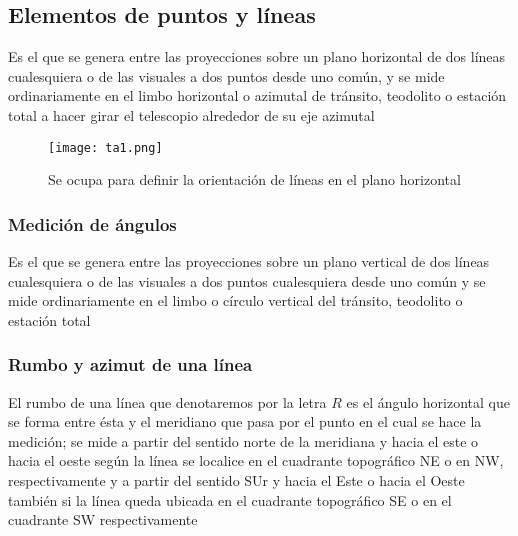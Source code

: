 \subsection{Elementos de puntos y líneas}

\begin{definition}
    Es el que se genera entre las proyecciones sobre un plano horizontal de dos líneas cualesquiera o de las visuales a dos puntos desde uno común, y se mide ordinariamente en el limbo horizontal o azimutal de tránsito, teodolito o estación total a hacer girar el telescopio alrededor de su eje azimutal
\end{definition}

\begin{figure}[h!]
  \centering
  \texttt{[image: ta1.png]}
  \caption{Se ocupa para definir la orientación de líneas en el plano horizontal}
  \label{ta1}
\end{figure}

\subsubsection{Medición de ángulos}

\begin{definition}
    Es el que se genera entre las proyecciones sobre un plano vertical de dos líneas cualesquiera o de las visuales a dos puntos cualesquiera desde uno común y se mide ordinariamente en el limbo o círculo vertical del tránsito, teodolito o estación total
\end{definition}

\subsubsection{Rumbo y azimut de una línea}

\begin{definition}[Rumbo]
    El rumbo de una línea que denotaremos por la letra $R$ es el ángulo horizontal que se forma entre ésta y el meridiano que pasa por el punto en el cual se hace la medición; se mide a partir del sentido norte de la meridiana y hacia el este o hacia el oeste según la línea se localice en el cuadrante topográfico NE o en NW, respectivamente y a partir del sentido SUr y hacia el Este o hacia el Oeste también si la línea queda ubicada en el cuadrante topográfico SE o en el cuadrante SW respectivamente
\end{definition}

